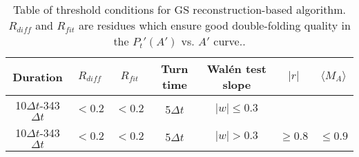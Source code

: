 \begin{table}[h!]
\centering
\caption[Threshold conditions for GS algorithm]{Table of threshold conditions for GS reconstruction-based algorithm. $R_{diff}$ and $R_{fit}$ are residues which ensure good double-folding quality in the $P_t'(A')$ vs. $A'$ curve..} %
\begin{tabular}{ccccccc}
\toprule
    Duration  & $R_{diff}$ & $R_{fit}$ & Turn time & Wal\'en test slope & $|r|$ & $\langle M_A\rangle$ \\ 
    \hline
    10$\Delta t$-343$\Delta t$ & $<0.2$ & $<0.2$ & 5$\Delta t$ & $|w|\leq 0.3$ & & \\
    10$\Delta t$-343$\Delta t$ & $<0.2$ & $<0.2$ & 5$\Delta t$ & $|w|> 0.3$ & $\geq 0.8$ & $\leq 0.9$ \\
\bottomrule %
\end{tabular}
\label{tab:thresholds}
\end{table}


